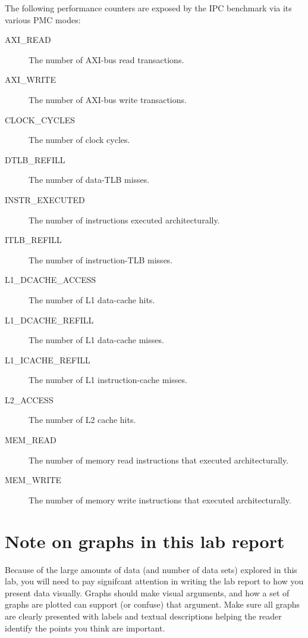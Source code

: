 \documentclass[a4paper,10pt]{article}
\begin{document}
The following performance counters are exposed by the IPC benchmark via its
various PMC modes:

\begin{description}

\item[AXI\_READ] The number of AXI-bus read transactions.

\item[AXI\_WRITE] The number of AXI-bus write transactions.

\item[CLOCK\_CYCLES] The number of clock cycles.

\item[DTLB\_REFILL] The number of data-TLB misses.

\item[INSTR\_EXECUTED] The number of instructions executed architecturally.

\item[ITLB\_REFILL] The number of instruction-TLB misses.

\item[L1\_DCACHE\_ACCESS] The number of L1 data-cache hits.

\item[L1\_DCACHE\_REFILL] The number of L1 data-cache misses.

\item[L1\_ICACHE\_REFILL] The number of L1 instruction-cache misses.

\item[L2\_ACCESS] The number of L2 cache hits.

\item[MEM\_READ] The number of memory read instructions that executed
  architecturally.

\item[MEM\_WRITE] The number of memory write instructions that executed
  architecturally.
\end{description}

\section*{Note on graphs in this lab report}

Because of the large amounts of data (and number of data sets) explored in
this lab, you will need to pay signifcant attention in writing the lab report
to how you present data visually.
Graphs should make visual arguments, and how a set of graphs are plotted can
support (or confuse) that argument.
Make sure all graphs are clearly presented with labels and textual
descriptions helping the reader identify the points you think are important.
\end{document}
